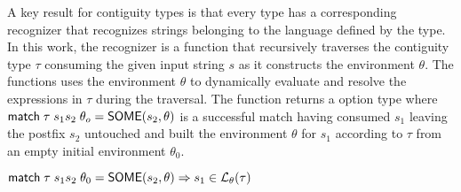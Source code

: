 A key result for contiguity types is that every type has a corresponding recognizer that recognizes strings belonging to the language defined by the type. In this work, the recognizer is a function  that recursively traverses the contiguity type $\tau$ consuming the given input string $s$ as it constructs the environment $\theta$. The functions uses the environment $\theta$ to dynamically evaluate and resolve the expressions in $\tau$ during the traversal. The  function returns a option type where $\mathsf{match}\; \tau\; s_1s_2\; \theta_o = \mathsf{SOME}(s_2, \theta)$ is a successful match having consumed $s_1$ leaving the postfix $s_2$ untouched and built the environment $\theta$ for $s_1$ according to $\tau$ from an empty initial environment $\theta_0$.

\begin{theorem} 
$\mathsf{match}\; \tau\; s_1s_2\; \theta_0 = \mathsf{SOME}(s_2, \theta) \Rightarrow s_1 \in {\mathcal L}_{\theta}({\tau})$
\end{theorem}